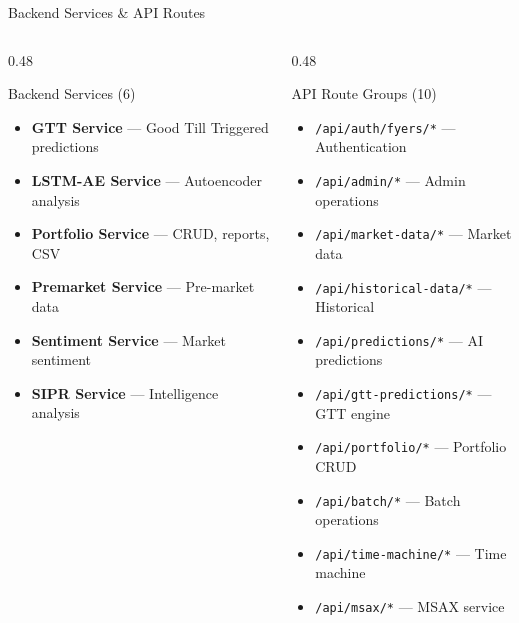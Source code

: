 \documentclass[aspectratio=169, 11pt]{beamer}
\begin{document}
\begin{frame}{Backend Services \& API Routes}
\begin{columns}[T]
\begin{column}{0.48\textwidth}
\begin{block}{Backend Services (6)}
\begin{itemize}
  \item \textbf{GTT Service} — Good Till Triggered predictions
  \item \textbf{LSTM-AE Service} — Autoencoder analysis
  \item \textbf{Portfolio Service} — CRUD, reports, CSV
  \item \textbf{Premarket Service} — Pre-market data
  \item \textbf{Sentiment Service} — Market sentiment
  \item \textbf{SIPR Service} — Intelligence analysis
\end{itemize}
\end{block}
\end{column}
\begin{column}{0.48\textwidth}
\begin{block}{API Route Groups (10)}
\begin{itemize}
  \item \texttt{/api/auth/fyers/*} — Authentication
  \item \texttt{/api/admin/*} — Admin operations
  \item \texttt{/api/market-data/*} — Market data
  \item \texttt{/api/historical-data/*} — Historical
  \item \texttt{/api/predictions/*} — AI predictions
  \item \texttt{/api/gtt-predictions/*} — GTT engine
  \item \texttt{/api/portfolio/*} — Portfolio CRUD
  \item \texttt{/api/batch/*} — Batch operations
  \item \texttt{/api/time-machine/*} — Time machine
  \item \texttt{/api/msax/*} — MSAX service
\end{itemize}
\end{block}
\end{column}
\end{columns}
\end{frame}
\end{document}
